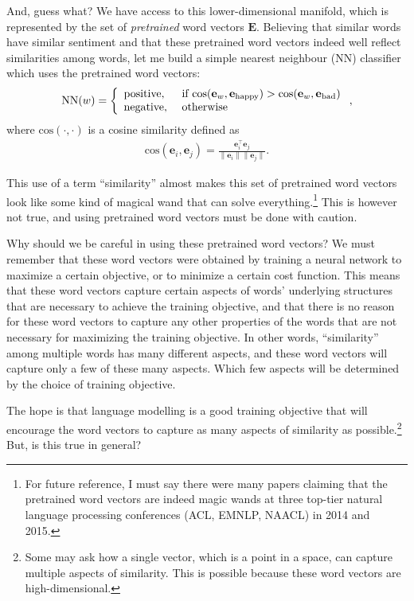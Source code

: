 \documentclass{report}
\newcommand{\vect}[1]{\mathbf{#1}}
\newcommand{\matr}[1]{\mathbf{#1}}
\newcommand{\ve}[0]{\vect{e}}
\newcommand{\mE}[0]{\matr{E}}
\begin{document}
And, guess what? We have access to this lower-dimensional manifold, which is
represented by the set of {\em pretrained} word vectors $\mE$. Believing that
similar words have similar sentiment and that these pretrained word vectors
indeed well reflect similarities among words, let me build a simple nearest
neighbour (NN) classifier which uses the pretrained word vectors:
\begin{align*}
    \text{NN}(w) = \left\{ \begin{array}{l l}
            \text{positive},&\text{ if } \text{cos}(\ve_w,\ve_{\text{happy}}) > 
            \text{cos}(\ve_w,\ve_{\text{bad}}) \\
            \text{negative},&\text{ otherwise}
        \end{array}
    \right.,
\end{align*}
where $\text{cos}(\cdot, \cdot)$ is a cosine similarity defined as
\begin{align*}
    \text{cos}(\ve_i, \ve_j) = \frac{\ve_i^\top \ve_j}{\|\ve_i\| \|\ve_j\|}.
\end{align*}

This use of a term ``similarity'' almost makes this set of pretrained word
vectors look like some kind of magical wand that can solve everything.\footnote{
    For future reference, I must say there were many papers claiming that the
    pretrained word vectors are indeed magic wands at three top-tier natural
    language processing conferences (ACL, EMNLP, NAACL) in 2014 and 2015.
} This is however not true, and using pretrained word vectors must be done with
caution. 

Why should we be careful in using these pretrained word vectors? We must
remember that these word vectors were obtained by training a neural network to
maximize a certain objective, or to minimize a certain cost function. This means
that these word vectors capture certain aspects of words' underlying structures
that are necessary to achieve the training objective, and that there is no
reason for these word vectors to capture any other properties of the words that
are not necessary for maximizing the training objective.  In other words,
``similarity'' among multiple words has many different aspects, and these word
vectors will capture only a few of these many aspects. Which few aspects will be
determined by the choice of training objective.

The hope is that language modelling is a good training objective that will
encourage the word vectors to capture as many aspects of similarity as
possible.\footnote{
    Some may ask how a single vector, which is a point in a space, can capture
    multiple aspects of similarity. This is possible because these word vectors
    are high-dimensional.
} But, is this true in general? 
\end{document}
